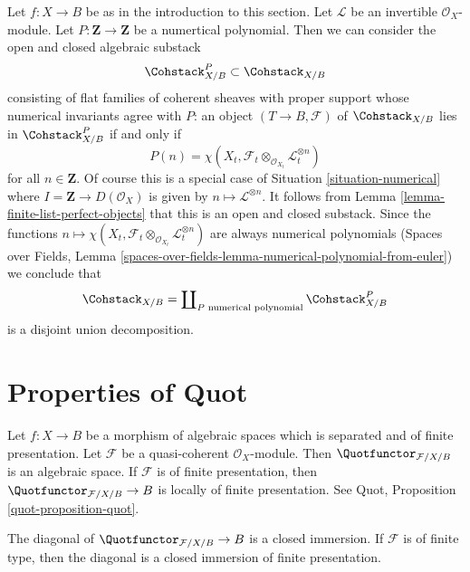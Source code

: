 \begin{example}
\label{example-hilbert-polynomial}
Let $f : X \to B$ be as in the introduction to this section.
Let $\mathcal{L}$ be an invertible $\mathcal{O}_X$-module.
Let $P : \mathbf{Z} \to \mathbf{Z}$ be a numertical polynomial.
Then we can consider the open and closed algebraic substack
$$
\Cohstack^P_{X/B} \subset \Cohstack_{X/B}
$$
consisting of flat families of coherent sheaves with proper support
whose numerical invariants agree with $P$: an object
$(T \to B, \mathcal{F})$ of $\Cohstack_{X/B}$ lies in
$\Cohstack^P_{X/B}$ if and only if
$$
P(n) =
\chi(X_t, \mathcal{F}_t \otimes_{\mathcal{O}_{X_t}} \mathcal{L}_t^{\otimes n})
$$
for all $n \in \mathbf{Z}$. Of course this is a
special case of Situation \ref{situation-numerical}
where $I = \mathbf{Z} \to D(\mathcal{O}_X)$ is given by
$n \mapsto \mathcal{L}^{\otimes n}$. It follows from
Lemma \ref{lemma-finite-list-perfect-objects}
that this is an open and closed substack. Since the functions
$n \mapsto
\chi(X_t, \mathcal{F}_t \otimes_{\mathcal{O}_{X_t}} \mathcal{L}_t^{\otimes n})$
are always numerical polynomials (Spaces over Fields, Lemma
\ref{spaces-over-fields-lemma-numerical-polynomial-from-euler})
we conclude that
$$
\Cohstack_{X/B} = \coprod\nolimits_{P\text{ numerical polynomial}}
\Cohstack^P_{X/B}
$$
is a disjoint union decomposition.
\end{example}







\section{Properties of Quot}
\label{section-quot}

\noindent
Let $f : X \to B$ be a morphism of algebraic spaces which is
separated and of finite presentation. Let $\mathcal{F}$ be a
quasi-coherent $\mathcal{O}_X$-module. Then
$\Quotfunctor_{\mathcal{F}/X/B}$ is an algebraic space.
If $\mathcal{F}$ is of finite presentation, then
$\Quotfunctor_{\mathcal{F}/X/B} \to B$ is locally of finite
presentation. See Quot, Proposition \ref{quot-proposition-quot}.

\begin{lemma}
\label{lemma-quot-diagonal-closed}
The diagonal of $\Quotfunctor_{\mathcal{F}/X/B} \to B$ is a closed immersion.
If $\mathcal{F}$ is of finite type, then the diagonal is a closed
immersion of finite presentation.
\end{lemma}


